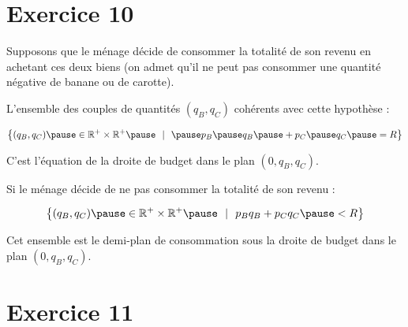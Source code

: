 \documentclass[9pt,professionalfonts,handout,hyperref]{beamer}
\begin{document}
\section{Exercice 10}

%

\begin{frame}

Supposons que le ménage décide de consommer la totalité de son revenu en
achetant ces deux biens (on admet qu'il ne peut pas consommer une
quantité négative de banane ou de carotte). \newline

\pause L'ensemble des couples de quantités $(q_B, q_C)$ cohérents avec cette hypothèse :

$$ \left\{(q_B, q_C) \pause \in \mathbb{R}^{+}\times\mathbb{R}^{+} \pause ~~|~~\pause p_B\pause q_B \pause + p_C\pause q_C\pause =R\right\}$$

\pause C'est l'équation de la droite de budget dans le plan $(0,q_B,q_C)$.

\bigskip

\pause Si le ménage décide de ne pas consommer la totalité de son revenu :

$$ \left\{(q_B, q_C) \pause \in \mathbb{R}^{+}\times\mathbb{R}^{+} \pause ~~|~~p_Bq_B + p_Cq_C\pause <R\right\}$$


\pause Cet ensemble est le demi-plan de consommation sous la droite de budget dans le plan $(0,q_B,q_C)$.

\end{frame}


\section{Exercice 11}
\end{document}
